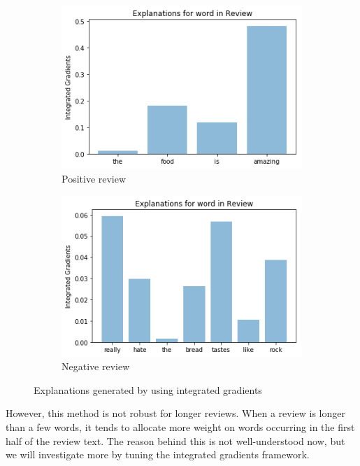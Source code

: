 \documentclass[11pt]{article}
\begin{document}
\begin{figure}[H]
	\centering
	\begin{subfigure}{0.45\textwidth}
		\centering
		\includegraphics[width=\linewidth]{figure2}
		\caption{Positive review}
		\label{fig:int-grad:pos}
	\end{subfigure} %
	\begin{subfigure}{0.45\textwidth}
		\centering
		\includegraphics[width=\linewidth]{figure3}
		\caption{Negative review}
		\label{fig:int-grad:neg}
	\end{subfigure}
	\caption{Explanations generated by using integrated gradients}
\end{figure}

However, this method is not robust for longer reviews. When a review is longer than a few words, it tends to allocate more weight on words occurring in the first half of the review text. The reason behind this is not well-understood now, but we will investigate more by tuning the integrated gradients framework.
\end{document}
